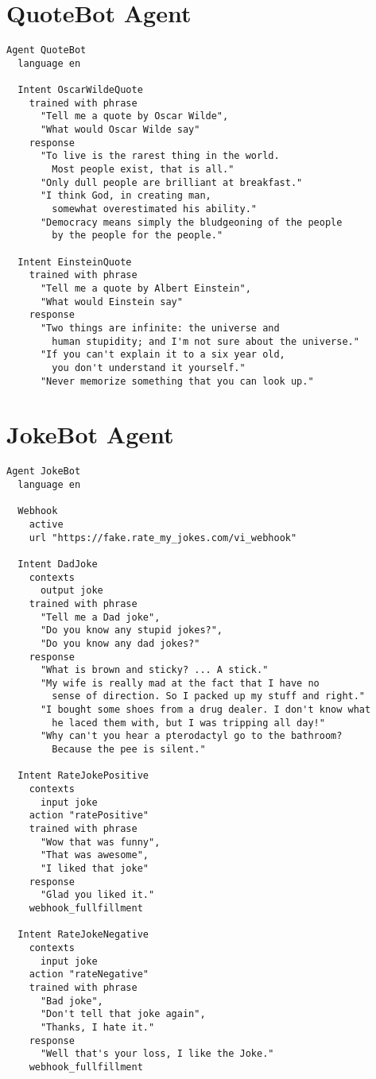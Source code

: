 \section{QuoteBot Agent}

\begin{lstlisting}
Agent QuoteBot
  language en
  
  Intent OscarWildeQuote
    trained with phrase
      "Tell me a quote by Oscar Wilde",
      "What would Oscar Wilde say"
    response
      "To live is the rarest thing in the world. 
        Most people exist, that is all."
      "Only dull people are brilliant at breakfast."
      "I think God, in creating man,
        somewhat overestimated his ability."
      "Democracy means simply the bludgeoning of the people
        by the people for the people."
      
  Intent EinsteinQuote
    trained with phrase
      "Tell me a quote by Albert Einstein",
      "What would Einstein say"
    response
      "Two things are infinite: the universe and
        human stupidity; and I'm not sure about the universe."
      "If you can't explain it to a six year old,
        you don't understand it yourself."
      "Never memorize something that you can look up."
\end{lstlisting}


\section{JokeBot Agent}

\begin{lstlisting}
Agent JokeBot
  language en
  
  Webhook
    active
    url "https://fake.rate_my_jokes.com/vi_webhook"
  
  Intent DadJoke
    contexts 
      output joke 
    trained with phrase
      "Tell me a Dad joke",
      "Do you know any stupid jokes?",
      "Do you know any dad jokes?"
    response 
      "What is brown and sticky? ... A stick."
      "My wife is really mad at the fact that I have no
        sense of direction. So I packed up my stuff and right."
      "I bought some shoes from a drug dealer. I don't know what
        he laced them with, but I was tripping all day!"
      "Why can't you hear a pterodactyl go to the bathroom?
        Because the pee is silent."
  
  Intent RateJokePositive
    contexts 
      input joke
    action "ratePositive"
    trained with phrase
      "Wow that was funny",
      "That was awesome",
      "I liked that joke"
    response
      "Glad you liked it."
    webhook_fullfillment
  
  Intent RateJokeNegative
    contexts 
      input joke
    action "rateNegative"
    trained with phrase
      "Bad joke",
      "Don't tell that joke again",
      "Thanks, I hate it."
    response
      "Well that's your loss, I like the Joke."
    webhook_fullfillment
\end{lstlisting}


